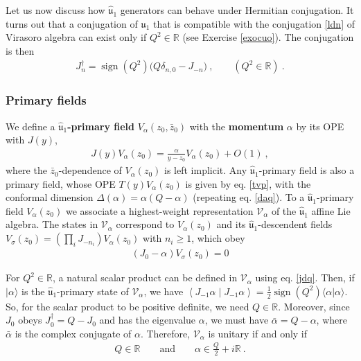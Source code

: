 \documentclass[12pt, a4paper, notitlepage, twoside]{report}
\numberwithin{equation}{section}
\theoremstyle{break}
\begin{document}
Let us now discuss how $\hat{\mathfrak{u}}_1$ generators can behave under Hermitian conjugation.
It turns out that a conjugation of $\hat{\mathfrak{u}}_1$ that is compatible with the conjugation \eqref{ldn} of Virasoro algebra  can exist only if $Q^2\in\mathbb{R}$ (see Exercise \ref{exocuo}). 
The conjugation is then 
\begin{align}
 J_n^\dagger = \operatorname{sign}(Q^2)\big( Q\delta_{n,0}-J_{-n} \big)\ ,\qquad (Q^2\in\mathbb{R}) \ .
\label{jdq}
\end{align}

\subsubsection{Primary fields}

We define a \textbf{\boldmath $\hat{\mathfrak{u}}_1$-primary field} $V_{\alpha}(z_0,\bar{z}_0)$ with the \textbf{\boldmath momentum} $\alpha$ by its OPE with $J(y)$,
\begin{align}
 \boxed{J(y) V_\alpha(z_0) = \frac{\alpha}{y-z_0} V_\alpha(z_0) + O(1)}\ ,
\label{jva}
\end{align}
where the $\bar{z}_0$-dependence of $V_\alpha(z_0)$ is left implicit. 
Any $\hat{\mathfrak{u}}_1$-primary field is also a primary field, whose OPE $T(y)V_\alpha(z_0)$ is given by eq. \eqref{tvp}, with the conformal dimension $\Delta(\alpha) = \alpha(Q-\alpha)$ (repeating eq. \eqref{daq}).
To a $\hat{\mathfrak{u}}_1$-primary field $V_\alpha(z_0)$ we associate a highest-weight representation $\mathcal{V}_\alpha$ of the $\hat{\mathfrak{u}}_1$ affine Lie algebra.
The states in $\mathcal{V}_\alpha$ correspond to $V_\alpha(z_0)$ and its $\hat{\mathfrak{u}}_1$-descendent fields $V_\sigma(z_0)=\left(\prod_i J_{-n_i}\right) V_\alpha(z_0)$ with $n_i\geq 1$, which obey 
\begin{align}
 \left(J_0 - \alpha\right) V_\sigma(z_0) = 0
\label{jma}
\end{align}

For $Q^2\in\mathbb{R}$, 
a natural scalar product can be defined in $\mathcal{V}_\alpha$ using eq. \eqref{jdq}.
Then, if $|\alpha\rangle$ is the $\hat{\mathfrak{u}}_1$-primary state of $\mathcal{V}_\alpha$, we have $\left< J_{-1}\alpha\middle|J_{-1}\alpha\right> = \frac12 \operatorname{sign}(Q^2) \langle \alpha|\alpha\rangle$.
So, for the scalar product to be positive definite, we need $Q\in \mathbb{R}$.
Moreover, since $J_0$ obeys $J_0^\dagger = Q-J_0$ and has the eigenvalue $\alpha$, we must have $\bar\alpha = Q-\alpha$, where $\bar \alpha$ is the complex conjugate of $\alpha$.
Therefore, $\mathcal{V}_\alpha$ is unitary if and only if
\begin{align}
 Q\in\mathbb{R} \qquad \text{and} \qquad \alpha \in \frac{Q}{2} + i{\mathbb{R}}\ .
\label{aif}
\end{align}
\end{document}
